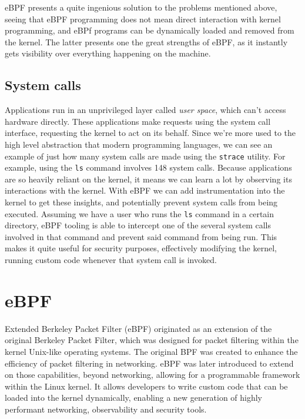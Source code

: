 eBPF presents a quite ingenious solution to the problems mentioned above, seeing that eBPF programming does not mean direct interaction with kernel programming, and eBPf programs can be dynamically loaded and removed from the kernel. The latter presents one the great strengths of eBPF, as it instantly gets visibility over everything happening on the machine.

\subsection{System calls}

Applications run in an unprivileged layer called \textit{user space}, which can't access hardware directly. These applications make requests using the system call interface, requesting the kernel to act on its behalf. Since we're more used to the high level abstraction that modern programming languages, we can see an example of just how many system calls are made using the \texttt{strace} utility. For example, using the \texttt{ls} command involves 148 system calls.
Because applications are so heavily reliant on the kernel, it means we can learn a lot by observing its interactions with the kernel. With eBPF we can add instrumentation into the kernel to get these insights, and potentially prevent system calls from being executed.
Assuming we have a user who runs the \texttt{ls} command in a certain directory, eBPF tooling is able to intercept one of the several system calls involved in that command and prevent said command from being run. This makes it quite useful for security purposes, effectively modifying the kernel, running custom code whenever that system call is invoked.

\section{eBPF}

Extended Berkeley Packet Filter (eBPF) originated as an extension of the original Berkeley Packet Filter, which was designed for packet filtering within the kernel Unix-like operating systems. The original BPF was created to enhance the efficiency of packet filtering in networking. eBPF was later introduced to extend on those capabilities, beyond networking, allowing for a programmable framework within the Linux kernel. It allows developers to write custom code that can be loaded into the kernel dynamically, enabling a new generation of highly performant networking, observability and security tools.

